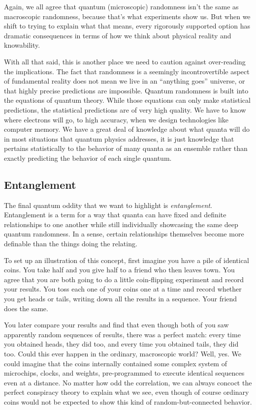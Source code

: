 \documentclass[12pt,onecolumn,preprintnumbers,amsmath,amssymbn,reprint,nofootinbib,superscriptaddress]{revtex4}    %
\begin{document}
Again, we all agree that quantum (microscopic) randomness isn't the same as macroscopic randomness, because that's what experiments show us.  But when we shift to trying to explain what that means, every rigorously supported option has dramatic consequences in terms of how we think about physical reality and knowability. 

With all that said, this is another place we need to caution against over-reading the implications.  The fact that randomness is a seemingly incontrovertible aspect of fundamental reality does not mean we live in an ``anything goes'' universe, or that highly precise predictions are impossible.  Quantum randomness is built into the equations of quantum theory.  While those equations can only make statistical predictions, the statistical predictions are of very high quality.  We have to know where electrons will go, to high accuracy, when we design technologies like computer memory.  We have a great deal of knowledge about what quanta will do in most situations that quantum physics addresses, it is just knowledge that pertains statistically to the behavior of many quanta as an ensemble rather than exactly predicting the behavior of each single quantum. 

\subsection{Entanglement}

The final quantum oddity that we want to highlight is {\em entanglement}.   Entanglement is a term for a way that quanta can have fixed and definite relationships to one another while still individually showcasing the same deep quantum randomness.  In a sense, certain relationships themselves become more definable than the things doing the relating.  

To set up an illustration of this concept, first imagine you have a pile of identical coins.  You take half and you give half to a friend who then leaves town.  You agree that you are both going to do a little coin-flipping experiment and record your results.  You toss each one of your coins one at a time and record whether you get heads or tails, writing down all the results in a sequence.  Your friend does the same.  

You later compare your results and find that even though both of you saw apparently random sequences of results, there was a perfect match:  every time you obtained heads, they did too, and every time you obtained tails, they did too.  Could this ever happen in the ordinary, macroscopic world?  Well, yes.  We could imagine that the coins internally contained some complex system of microchips, clocks, and weights, pre-programmed to execute identical sequences even at a distance.  No matter how odd the correlation, we can always concoct the perfect conspiracy theory to explain what we see, even though of course ordinary coins would not be expected to show this kind of random-but-connected behavior.  
\end{document}
